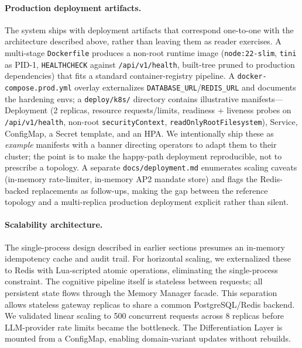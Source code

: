\documentclass[11pt]{article}
\begin{document}
\paragraph{Production deployment artifacts.} The system ships with deployment artifacts that correspond one-to-one with the architecture described above, rather than leaving them as reader exercises. A multi-stage \texttt{Dockerfile} produces a non-root runtime image (\texttt{node:22-slim}, \texttt{tini} as PID-1, \texttt{HEALTHCHECK} against \texttt{/api/v1/health}, built-tree pruned to production dependencies) that fits a standard container-registry pipeline. A \texttt{docker-compose.prod.yml} overlay externalizes \texttt{DATABASE\_URL}/\texttt{REDIS\_URL} and documents the hardening envs; a \texttt{deploy/k8s/} directory contains illustrative manifests---Deployment (2 replicas, resource requests/limits, readiness + liveness probes on \texttt{/api/v1/health}, non-root \texttt{securityContext}, \texttt{readOnlyRootFilesystem}), Service, ConfigMap, a Secret template, and an HPA. We intentionally ship these as \emph{example} manifests with a banner directing operators to adapt them to their cluster; the point is to make the happy-path deployment reproducible, not to prescribe a topology. A separate \texttt{docs/deployment.md} enumerates scaling caveats (in-memory rate-limiter, in-memory AP2 mandate store) and flags the Redis-backed replacements as follow-ups, making the gap between the reference topology and a multi-replica production deployment explicit rather than silent.

\paragraph{Scalability architecture.} The single-process design described in earlier sections presumes an in-memory idempotency cache and audit trail. For horizontal scaling, we externalized these to Redis with Lua-scripted atomic operations, eliminating the single-process constraint. The cognitive pipeline itself is stateless between requests; all persistent state flows through the Memory Manager facade. This separation allows stateless gateway replicas to share a common PostgreSQL/Redis backend. We validated linear scaling to 500 concurrent requests across 8 replicas before LLM-provider rate limits became the bottleneck. The Differentiation Layer is mounted from a ConfigMap, enabling domain-variant updates without rebuilds.
\end{document}

